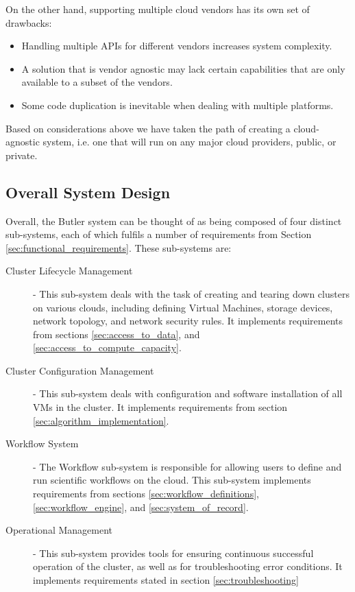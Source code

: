 On the other hand, supporting multiple cloud vendors has its own set of drawbacks:

\begin{itemize}
\item Handling multiple APIs for different vendors increases system complexity.
\item A solution that is vendor agnostic may lack certain capabilities that are only available to a subset of the vendors.
\item Some code duplication is inevitable when dealing with multiple platforms.
\end{itemize}

Based on considerations above we have taken the path of creating a cloud-agnostic system, i.e. one that will run on any major cloud providers, public, or private.

\subsection {Overall System Design}

Overall, the Butler system can be thought of as being composed of four distinct sub-systems, each of which fulfils a number of requirements from Section \ref{sec:functional_requirements}. These sub-systems are:

\begin{description}
\item [Cluster Lifecycle Management] - This sub-system deals with the task of creating and tearing down clusters on various clouds, including defining Virtual Machines, storage devices, network topology, and network security rules. It implements requirements from sections \ref{sec:access_to_data}, and \ref{sec:access_to_compute_capacity}.
\item [Cluster Configuration Management] - This sub-system deals with configuration and software installation of all VMs in the cluster. It implements requirements from section \ref{sec:algorithm_implementation}.
\item [Workflow System] - The Workflow sub-system is responsible for allowing users to define and run scientific workflows on the cloud. This sub-system implements requirements from sections \ref{sec:workflow_definitions}, \ref{sec:workflow_engine}, and \ref{sec:system_of_record}.
\item [Operational Management] - This sub-system provides tools for ensuring continuous successful operation of the cluster, as well as for troubleshooting error conditions. It implements requirements stated in section \ref{sec:troubleshooting}
\end{description}

